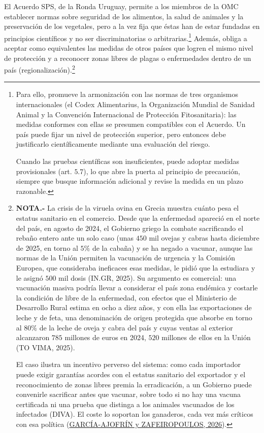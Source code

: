 \documentclass[10pt,a4paper]{article}
\begin{document}
El Acuerdo SPS, de la Ronda Uruguay, permite a los miembros de la OMC establecer normas sobre seguridad de los alimentos, la salud de animales y la preservación de los vegetales, pero a la vez fija que éstas han de estar fundadas en principios científicos y no ser discriminatorias o arbitrarias.\footnote{%
  Para ello, promueve la armonización con las normas de tres organismos internacionales (el Codex Alimentarius, la Organización Mundial de Sanidad Animal y la Convención Internacional de Protección Fitosanitaria): las medidas conformes con ellas se presumen compatibles con el Acuerdo. Un país puede fijar un nivel de protección superior, pero entonces debe justificarlo científicamente mediante una evaluación del riesgo. 

  Cuando las pruebas científicas son insuficientes, puede adoptar medidas provisionales (art. $5.7$), lo que abre la puerta al principio de precaución, siempre que busque información adicional y revise la medida en un plazo razonable.
} Además, obliga a aceptar como equivalentes las medidas de otros países que logren el mismo nivel de protección y a reconocer zonas libres de plagas o enfermedades dentro de un país (regionalización).\footnote{%
  \textbf{NOTA.-} La crisis de la viruela ovina en Grecia muestra cuánto pesa el estatus sanitario en el comercio. Desde que la enfermedad apareció en el norte del país, en agosto de 2024, el Gobierno griego la combate sacrificando el rebaño entero ante un solo caso (unas $450$ mil ovejas y cabras hasta diciembre de 2025, en torno al $5\%$ de la cabaña) y se ha negado a vacunar, aunque las normas de la Unión permiten la vacunación de urgencia y la Comisión Europea, que consideraba ineficaces esas medidas, le pidió que la estudiara y le asignó $500$ mil dosis (IN.GR, 2025). Su argumento es comercial: una vacunación masiva podría llevar a considerar el país zona endémica y costarle la condición de libre de la enfermedad, con efectos que el Ministerio de Desarrollo Rural estima en ocho a diez años, y con ella las exportaciones de leche y de feta, una denominación de origen protegida que absorbe en torno al $80\%$ de la leche de oveja y cabra del país y cuyas ventas al exterior alcanzaron $785$ millones de euros en 2024, $520$ millones de ellos en la Unión (TO VIMA, 2025).

  El caso ilustra un incentivo perverso del sistema: como cada importador puede exigir garantías acordes con el estatus sanitario del exportador y el reconocimiento de zonas libres premia la erradicación, a un Gobierno puede convenirle sacrificar antes que vacunar, sobre todo si no hay una vacuna certificada ni una prueba que distinga a los animales vacunados de los infectados (DIVA). El coste lo soportan los ganaderos, cada vez más críticos con esa política (\href{https://www.elconfidencial.com/mundo/2026-01-29/viruela-ovina-grecia-queso-feta-1hms_4291864/}{GARCÍA-AJOFRÍN y ZAFEIROPOULOS, 2026}).

}
\end{document}
